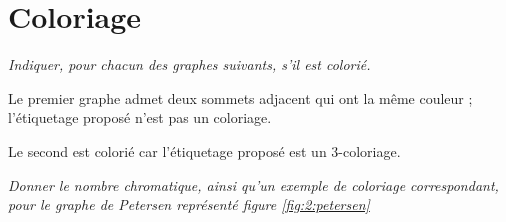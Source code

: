 \section{Coloriage} 
\begin{Exercise}\it
Indiquer, pour chacun des graphes suivants, s'il est colorié.
\end{Exercise} 
\begin{Answer}
Le premier graphe admet deux sommets adjacent qui ont la même couleur ; l'étiquetage proposé n'est pas un coloriage. 

Le second est colorié car l'étiquetage proposé est un 3-coloriage.
\end{Answer}
\begin{center}
\end{center}
\begin{Exercise}\it 
Donner le nombre chromatique, ainsi qu'un exemple de coloriage correspondant, pour le \emph{graphe de Petersen} représenté figure \ref{fig:2:petersen} 
\end{Exercise}  
